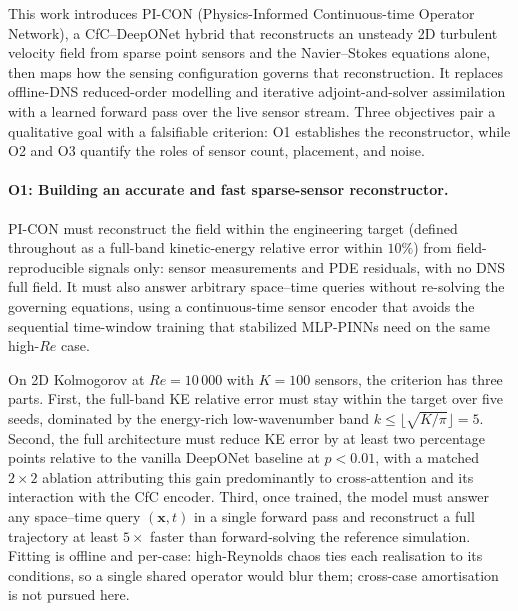 This work introduces PI-CON (Physics-Informed Continuous-time Operator Network), a CfC--DeepONet hybrid that reconstructs an unsteady 2D turbulent velocity field from sparse point sensors and the Navier--Stokes equations alone, then maps how the sensing configuration governs that reconstruction. It replaces offline-DNS reduced-order modelling and iterative adjoint-and-solver assimilation with a learned forward pass over the live sensor stream. Three objectives pair a qualitative goal with a falsifiable criterion: O1 establishes the reconstructor, while O2 and O3 quantify the roles of sensor count, placement, and noise.

\paragraph{O1: Building an accurate and fast sparse-sensor reconstructor.}
PI-CON must reconstruct the field within the engineering target (defined throughout as a full-band kinetic-energy relative error within $10\%$) from field-reproducible signals only: sensor measurements and PDE residuals, with no DNS full field. It must also answer arbitrary space--time queries without re-solving the governing equations, using a continuous-time sensor encoder that avoids the sequential time-window training that stabilized MLP-PINNs need on the same high-$Re$ case.

On 2D Kolmogorov at $Re = 10\,000$ with $K = 100$ sensors, the criterion has three parts. First, the full-band KE relative error must stay within the target over five seeds, dominated by the energy-rich low-wavenumber band $k \le \lfloor \sqrt{K/\pi} \rfloor = 5$. Second, the full architecture must reduce KE error by at least two percentage points relative to the vanilla DeepONet baseline at $p<0.01$, with a matched $2\times2$ ablation attributing this gain predominantly to cross-attention and its interaction with the CfC encoder. Third, once trained, the model must answer any space--time query $(\mathbf{x},t)$ in a single forward pass and reconstruct a full trajectory at least $5\times$ faster than forward-solving the reference simulation. Fitting is offline and per-case: high-Reynolds chaos ties each realisation to its conditions, so a single shared operator would blur them; cross-case amortisation is not pursued here.


